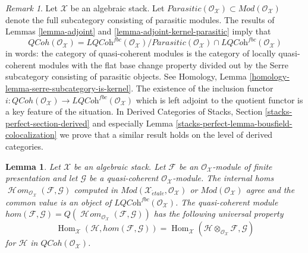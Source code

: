 \documentclass{stacks-project}
\theoremstyle{plain}
\newtheorem{lemma}[subsection]{Lemma}
\theoremstyle{definition}
\theoremstyle{remark}
\newtheorem{remark}[subsection]{Remark}
\numberwithin{equation}{subsection}
\def\Hom{\mathop{\mathrm{Hom}}\nolimits}
\def\SheafHom{\mathop{\mathcal{H}\!\mathit{om}}\nolimits}
\def\etale{{\acute{e}tale}}
\def\QCoh{\mathit{QCoh}}
\begin{document}
\begin{remark}
\label{remark-bousfield-colocalization}
Let $\mathcal{X}$ be an algebraic stack. Let
$\textit{Parasitic}(\mathcal{O}_\mathcal{X}) \subset
\textit{Mod}(\mathcal{O}_\mathcal{X})$ denote the
full subcategory consisting of parasitic modules. The results of
Lemmas \ref{lemma-adjoint} and \ref{lemma-adjoint-kernel-parasitic}
imply that
$$
\QCoh(\mathcal{O}_\mathcal{X}) =
\textit{LQCoh}^{fbc}(\mathcal{O}_\mathcal{X}) /
\textit{Parasitic}(\mathcal{O}_\mathcal{X})
\cap \textit{LQCoh}^{fbc}(\mathcal{O}_\mathcal{X})
$$
in words: the category of quasi-coherent modules is the category
of locally quasi-coherent modules with the flat base change property
divided out by the Serre subcategory consisting of parasitic objects.
See Homology, Lemma \ref{homology-lemma-serre-subcategory-is-kernel}.
The existence of the inclusion functor
$i : \QCoh(\mathcal{O}_\mathcal{X}) \to
\textit{LQCoh}^{fbc}(\mathcal{O}_\mathcal{X})$
which is left adjoint to the quotient functor is a key feature of
the situation. In Derived Categories of Stacks, Section
\ref{stacks-perfect-section-derived} and especially
Lemma \ref{stacks-perfect-lemma-bousfield-colocalization}
we prove that a similar result holds on the level of derived categories.
\end{remark}

\begin{lemma}
\label{lemma-internal-hom-fp-into-qcoh}
Let $\mathcal{X}$ be an algebraic stack. Let $\mathcal{F}$ be an
$\mathcal{O}_\mathcal{X}$-module of finite presentation and let
$\mathcal{G}$ be a quasi-coherent $\mathcal{O}_\mathcal{X}$-module.
The internal homs
$\SheafHom_{\mathcal{O}_\mathcal{X}}(\mathcal{F}, \mathcal{G})$
computed in
$\textit{Mod}(\mathcal{X}_\etale, \mathcal{O}_\mathcal{X})$ or
$\textit{Mod}(\mathcal{O}_\mathcal{X})$ agree and the common value
is an object of $\textit{LQCoh}^{fbc}(\mathcal{O}_\mathcal{X})$.
The quasi-coherent module
$
hom(\mathcal{F}, \mathcal{G}) =
Q(\SheafHom_{\mathcal{O}_\mathcal{X}}(\mathcal{F}, \mathcal{G}))
$
has the following universal property
$$
\Hom_\mathcal{X}(\mathcal{H}, hom(\mathcal{F}, \mathcal{G})) =
\Hom_\mathcal{X}(\mathcal{H} \otimes_{\mathcal{O}_\mathcal{X}} \mathcal{F},
\mathcal{G})
$$
for $\mathcal{H}$ in $\QCoh(\mathcal{O}_\mathcal{X})$.
\end{lemma}
\end{document}
